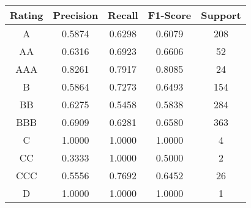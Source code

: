 \footnotesize
\begin{tabular}{ccccc}
\toprule
Rating & Precision & Recall & F1-Score & Support \\
\midrule
A & 0.5874 & 0.6298 & 0.6079 & 208 \\
AA & 0.6316 & 0.6923 & 0.6606 & 52 \\
AAA & 0.8261 & 0.7917 & 0.8085 & 24 \\
B & 0.5864 & 0.7273 & 0.6493 & 154 \\
BB & 0.6275 & 0.5458 & 0.5838 & 284 \\
BBB & 0.6909 & 0.6281 & 0.6580 & 363 \\
C & 1.0000 & 1.0000 & 1.0000 & 4 \\
CC & 0.3333 & 1.0000 & 0.5000 & 2 \\
CCC & 0.5556 & 0.7692 & 0.6452 & 26 \\
D & 1.0000 & 1.0000 & 1.0000 & 1 \\
\bottomrule
\end{tabular}

\normalsize
